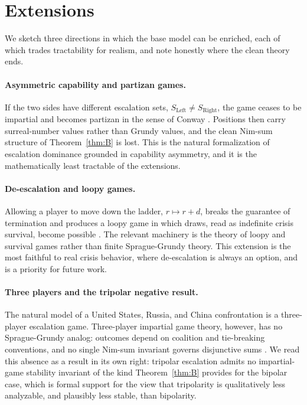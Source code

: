 \documentclass[11pt]{article}
\theoremstyle{plain}
\theoremstyle{definition}
\theoremstyle{remark}
\begin{document}
\section{Extensions}\label{sec:extensions}

We sketch three directions in which the base model can be enriched, each of
which trades tractability for realism, and note honestly where the clean
theory ends.

\paragraph{Asymmetric capability and partizan games.}
If the two sides have different escalation sets, $S_{\mathrm{Left}}\neq
S_{\mathrm{Right}}$, the game ceases to be impartial and becomes partizan in
the sense of Conway \citep{conway1976, bcg1982}. Positions then carry
surreal-number values rather than Grundy values, and the clean Nim-sum
structure of Theorem~\ref{thm:B} is lost. This is the natural formalization
of escalation dominance grounded in capability asymmetry, and it is the
mathematically least tractable of the extensions.

\paragraph{De-escalation and loopy games.}
Allowing a player to move down the ladder, $r\mapsto r+d$, breaks the
guarantee of termination and produces a loopy game in which draws, read as
indefinite crisis survival, become possible \citep{bcg1982}. The relevant
machinery is the theory of loopy and survival games rather than finite
Sprague-Grundy theory. This extension is the most faithful to real crisis
behavior, where de-escalation is always an option, and is a priority for
future work.

\paragraph{Three players and the tripolar negative result.}
The natural model of a United States, Russia, and China confrontation is a
three-player escalation game. Three-player impartial game theory, however,
has no Sprague-Grundy analog: outcomes depend on coalition and tie-breaking
conventions, and no single Nim-sum invariant governs disjunctive sums
\citep{li1978, straffin1985, propp2000}. We read this absence as a result in
its own right: tripolar escalation admits no impartial-game stability
invariant of the kind Theorem~\ref{thm:B} provides for the bipolar case,
which is formal support for the view that tripolarity is qualitatively less
analyzable, and plausibly less stable, than bipolarity.
\end{document}
